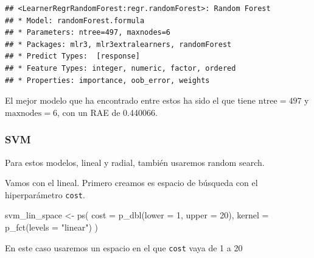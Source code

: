\documentclass[
  11pt,
  a4paper,
]{article}
\newenvironment{Shaded}{\begin{snugshade}}{\end{snugshade}}
\newcommand{\AttributeTok}[1]{\textcolor[rgb]{0.77,0.63,0.00}{#1}}
\newcommand{\CommentTok}[1]{\textcolor[rgb]{0.56,0.35,0.01}{\textit{#1}}}
\newcommand{\ConstantTok}[1]{\textcolor[rgb]{0.00,0.00,0.00}{#1}}
\newcommand{\DecValTok}[1]{\textcolor[rgb]{0.00,0.00,0.81}{#1}}
\newcommand{\FunctionTok}[1]{\textcolor[rgb]{0.00,0.00,0.00}{#1}}
\newcommand{\NormalTok}[1]{#1}
\newcommand{\OtherTok}[1]{\textcolor[rgb]{0.56,0.35,0.01}{#1}}
\newcommand{\SpecialCharTok}[1]{\textcolor[rgb]{0.00,0.00,0.00}{#1}}
\newcommand{\StringTok}[1]{\textcolor[rgb]{0.31,0.60,0.02}{#1}}
\begin{document}
\begin{verbatim}
## <LearnerRegrRandomForest:regr.randomForest>: Random Forest
## * Model: randomForest.formula
## * Parameters: ntree=497, maxnodes=6
## * Packages: mlr3, mlr3extralearners, randomForest
## * Predict Types:  [response]
## * Feature Types: integer, numeric, factor, ordered
## * Properties: importance, oob_error, weights
\end{verbatim}

El mejor modelo que ha encontrado entre estos ha sido el que tiene
\(\text{ntree}=497\) y \(\text{maxnodes}=6\), con un RAE de 0.440066.

\subsubsection{SVM}

Para estos modelos, lineal y radial, también usaremos random search.

Vamos con el lineal. Primero creamos es espacio de búsqueda con el
hiperparámetro \texttt{cost}.

\begin{Shaded}
\begin{Highlighting}[]
\NormalTok{svm\_lin\_space }\OtherTok{\textless{}{-}} \FunctionTok{ps}\NormalTok{(}
  \AttributeTok{cost =} \FunctionTok{p\_dbl}\NormalTok{(}\AttributeTok{lower =} \DecValTok{1}\NormalTok{, }\AttributeTok{upper =} \DecValTok{20}\NormalTok{),}
  \AttributeTok{kernel =} \FunctionTok{p\_fct}\NormalTok{(}\AttributeTok{levels =} \StringTok{"linear"}\NormalTok{)}
\NormalTok{)}
\end{Highlighting}
\end{Shaded}

En este caso usaremos un espacio en el que \texttt{cost} vaya de 1 a 20

\begin{Shaded}
\end{Shaded}
\end{document}
